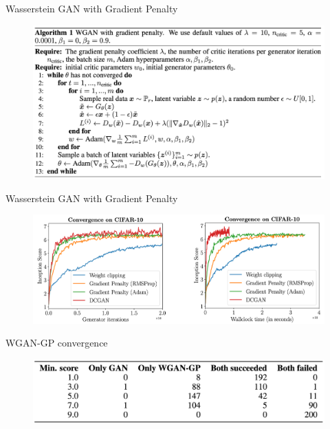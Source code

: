 \begin{frame}{Wasserstein GAN with Gradient Penalty}
	
	\begin{figure}
		\centering
		\includegraphics[width=1.0\linewidth]{figs/wgan_gp_pseudocode}
	\end{figure}

\end{frame}
\begin{frame}{Wasserstein GAN with Gradient Penalty}
	\begin{figure}
		\centering
		\includegraphics[width=\linewidth]{figs/wgan_gp_convergence}
	\end{figure}
	\begin{block}{WGAN-GP convergence}
		\begin{figure}
			\centering
			\includegraphics[width=0.75\linewidth]{figs/wgan_gp_wgan}
		\end{figure}
	\end{block}
	
\end{frame}
